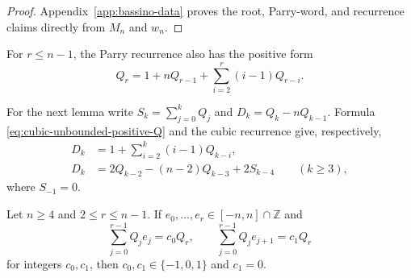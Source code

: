 \begin{proof}
Appendix~\ref{app:bassino-data} proves the root, Parry-word, and recurrence
claims directly from $M_n$ and $w_n$.
\end{proof}

For $r\le n-1$, the Parry recurrence also has the positive form
\begin{equation}
Q_r=1+nQ_{r-1}+\sum_{i=2}^r(i-1)Q_{r-i}.
\label{eq:cubic-unbounded-positive-Q}
\end{equation}

For the next lemma write $S_k=\sum_{j=0}^kQ_j$ and
$D_k=Q_k-nQ_{k-1}$.  Formula
\eqref{eq:cubic-unbounded-positive-Q} and the cubic recurrence give,
respectively,
\begin{align}
D_k&=1+\sum_{i=2}^k(i-1)Q_{k-i},
\label{eq:cubic-unbounded-D-positive}\\
D_k&=2Q_{k-2}-(n-2)Q_{k-3}+2S_{k-4}
\qquad(k\ge3),
\label{eq:cubic-unbounded-D-alternate}
\end{align}
where $S_{-1}=0$.

\begin{lemma}
\label{lem:cubic-unbounded-two-window}
Let $n\ge4$ and $2\le r\le n-1$.  If
$e_0,\ldots,e_r\in[-n,n]\cap\mathbb Z$ and
\[
\sum_{j=0}^{r-1}Q_je_j=c_0Q_r,
\qquad
\sum_{j=0}^{r-1}Q_je_{j+1}=c_1Q_r
\]
for integers $c_0,c_1$, then $c_0,c_1\in\{-1,0,1\}$ and $c_1=0$.
\end{lemma}

